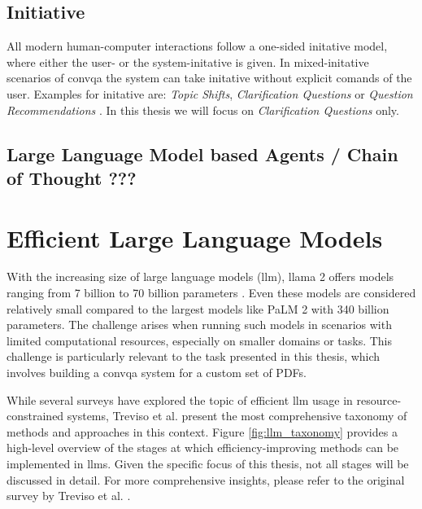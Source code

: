 \subsection{Initiative}
\label{subsec:cqa_initiative}

All modern human-computer interactions follow a one-sided initative model, where either the user- or the system-initative is given. In mixed-initative scenarios of \gls{convqa} the system can take initative without explicit comands of the user. Examples for initative are: \textit{Topic Shifts}, \textit{Clarification Questions} or \textit{Question Recommendations} \cite{zamani_conversational_2023}. In this thesis we will focus on \textit{Clarification Questions} only.



\subsection{Large Language Model based Agents / Chain of Thought ???}
\label{subsec:cqa_llm_agents}

\section{Efficient Large Language Models}
\label{sec:efficient_llm}

With the increasing size of large language models (\gls{llm}), \gls{llama} 2 offers models ranging from 7 billion to 70 billion parameters \cite{touvron_llama_2023}. Even these models are considered relatively small compared to the largest models like PaLM 2 \cite{anil_palm_2023} with 340 billion parameters. The challenge arises when running such models in scenarios with limited computational resources, especially on smaller domains or tasks. This challenge is particularly relevant to the task presented in this thesis, which involves building a \gls{convqa} system for a custom set of PDFs.

While several surveys \cite{ling_domain_2023, zhao_survey_2023} have explored the topic of efficient \gls{llm} usage in resource-constrained systems, Treviso et al. \cite{treviso_efficient_2023} present the most comprehensive taxonomy of methods and approaches in this context. Figure \ref{fig:llm_taxonomy} provides a high-level overview of the stages at which efficiency-improving methods can be implemented in \gls{llm}s. Given the specific focus of this thesis, not all stages will be discussed in detail. For more comprehensive insights, please refer to the original survey by Treviso et al. \cite{treviso_efficient_2023}.

